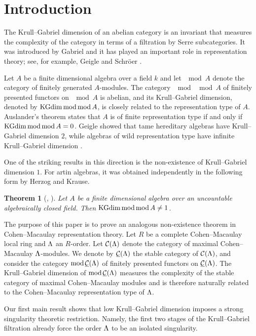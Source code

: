 \documentclass[11pt]{amsart}
\newtheorem{theorem}{Theorem}[section]
\theoremstyle{definition}
\numberwithin{equation}{section}
\begin{document}
\section{Introduction}\label{Intro}
The Krull--Gabriel dimension of an abelian category is an invariant that measures the complexity of the category in terms of a filtration by Serre subcategories. 
It was introduced by Gabriel \cite{Ga62} and it has played an important role in representation theory; see, for example,  Geigle \cite{G85} and Schr\"oer \cite{S00}. 

Let $A$ be a finite dimensional algebra over a field $k$ and let $\mod A$ denote the category of finitely generated $A$-modules. 
The category $\mod \mod A$ of finitely presented functors on $\mod A$ is abelian, and its Krull--Gabriel dimension, denoted by $\mathrm{KGdim}\, \mathrm{mod}\, \mathrm{mod}\, A$, is closely related to the representation type of $A$. 
Auslander's theorem \cite{A80} states that $A$ is of finite representation type if and only if $\mathrm{KGdim}\, \mathrm{mod}\, \mathrm{mod}\, A = 0$. 
Geigle \cite{G85} showed that tame hereditary algebras have Krull--Gabriel dimension $2$, while algebras of wild representation type have infinite Krull--Gabriel dimension \cite{Kr01}.

One of the striking results in this direction is the non-existence of Krull--Gabriel dimension $1$.
For artin algebras, it was obtained independently in the following form by Herzog and Krause. 


\begin{theorem}[{\cite[Theorem 3.6]{He97}, \cite[Corollary 11.4]{Kr98}}]\label{Intro1}
Let $A$ be a finite dimensional algebra over an uncountable algebraically closed field. 
Then $\mathrm{KGdim}\, \mathrm{mod}\, \mathrm{mod}\, A \neq 1$. 
\end{theorem}

The purpose of this paper is to prove an analogous non-existence theorem in Cohen--Macaulay representation theory. 
Let $R$ be a complete Cohen--Macaulay local ring and $\Lambda$ an $R$-order. 
Let ${\mathcal C}(\Lambda )$ denote the category of maximal Cohen--Macaulay $\Lambda$-modules. 
We denote by $\underline{{\mathcal C}}(\Lambda )$ the stable category of ${\mathcal C}(\Lambda )$, and consider the category ${\mathrm{mod}}\,\underline{{\mathcal C}}(\Lambda )$ of finitely presented functors on $\underline{{\mathcal C}}(\Lambda )$. 
The Krull--Gabriel dimension of ${\mathrm{mod}}\,\underline{{\mathcal C}}(\Lambda )$ measures the complexity of the stable category of maximal Cohen--Macaulay modules and is therefore naturally related to the Cohen--Macaulay representation type of $\Lambda$.

Our first main result shows that low Krull--Gabriel dimension imposes a strong singularity theoretic restriction.
Namely, the first two stages of the Krull--Gabriel filtration already force the order $\Lambda$ to be an isolated singularity.
\end{document}
